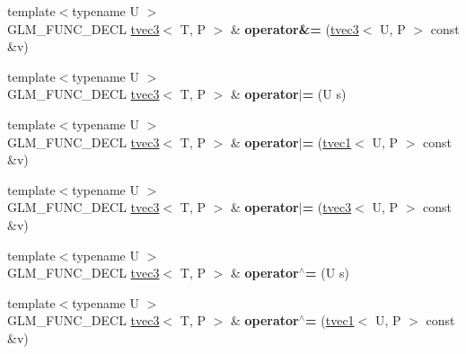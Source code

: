 \begin{DoxyCompactItemize}
\item 
\hypertarget{structglm_1_1tvec3_aca1630f439ac6a204ed15f3513c057b1}{{\footnotesize template$<$typename U $>$ }\\G\-L\-M\-\_\-\-F\-U\-N\-C\-\_\-\-D\-E\-C\-L \hyperlink{structglm_1_1tvec3}{tvec3}$<$ T, P $>$ \& {\bfseries operator\&=} (\hyperlink{structglm_1_1tvec3}{tvec3}$<$ U, P $>$ const \&v)}\label{structglm_1_1tvec3_aca1630f439ac6a204ed15f3513c057b1}

\item 
\hypertarget{structglm_1_1tvec3_a86a88aaeac4fac60f2b0de6ad499d200}{{\footnotesize template$<$typename U $>$ }\\G\-L\-M\-\_\-\-F\-U\-N\-C\-\_\-\-D\-E\-C\-L \hyperlink{structglm_1_1tvec3}{tvec3}$<$ T, P $>$ \& {\bfseries operator$\vert$=} (U s)}\label{structglm_1_1tvec3_a86a88aaeac4fac60f2b0de6ad499d200}

\item 
\hypertarget{structglm_1_1tvec3_a2fe619296352d6a5298b63b3d118bbeb}{{\footnotesize template$<$typename U $>$ }\\G\-L\-M\-\_\-\-F\-U\-N\-C\-\_\-\-D\-E\-C\-L \hyperlink{structglm_1_1tvec3}{tvec3}$<$ T, P $>$ \& {\bfseries operator$\vert$=} (\hyperlink{structglm_1_1tvec1}{tvec1}$<$ U, P $>$ const \&v)}\label{structglm_1_1tvec3_a2fe619296352d6a5298b63b3d118bbeb}

\item 
\hypertarget{structglm_1_1tvec3_a81a873ab5ca19d6bf3360a11f65d4f50}{{\footnotesize template$<$typename U $>$ }\\G\-L\-M\-\_\-\-F\-U\-N\-C\-\_\-\-D\-E\-C\-L \hyperlink{structglm_1_1tvec3}{tvec3}$<$ T, P $>$ \& {\bfseries operator$\vert$=} (\hyperlink{structglm_1_1tvec3}{tvec3}$<$ U, P $>$ const \&v)}\label{structglm_1_1tvec3_a81a873ab5ca19d6bf3360a11f65d4f50}

\item 
\hypertarget{structglm_1_1tvec3_a2997272bad29b52005daaaf94d60c7b0}{{\footnotesize template$<$typename U $>$ }\\G\-L\-M\-\_\-\-F\-U\-N\-C\-\_\-\-D\-E\-C\-L \hyperlink{structglm_1_1tvec3}{tvec3}$<$ T, P $>$ \& {\bfseries operator$^\wedge$=} (U s)}\label{structglm_1_1tvec3_a2997272bad29b52005daaaf94d60c7b0}

\item 
\hypertarget{structglm_1_1tvec3_a5dd85e96e456dee71a1e62bfed87aaf5}{{\footnotesize template$<$typename U $>$ }\\G\-L\-M\-\_\-\-F\-U\-N\-C\-\_\-\-D\-E\-C\-L \hyperlink{structglm_1_1tvec3}{tvec3}$<$ T, P $>$ \& {\bfseries operator$^\wedge$=} (\hyperlink{structglm_1_1tvec1}{tvec1}$<$ U, P $>$ const \&v)}\label{structglm_1_1tvec3_a5dd85e96e456dee71a1e62bfed87aaf5}


\end{DoxyCompactItemize}
